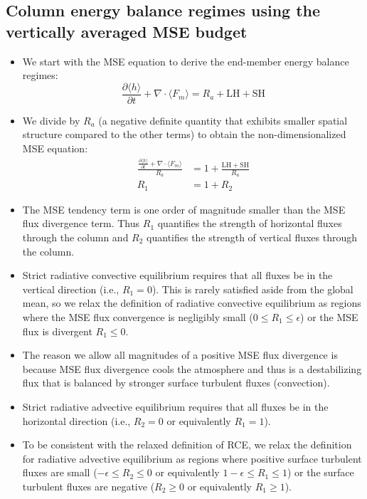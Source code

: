 \documentclass{ametsocV5}
\begin{document}
\subsection{Column energy balance regimes using the vertically averaged MSE budget}
\begin{itemize}
  \item We start with the MSE equation to derive the end-member energy balance regimes:
        \begin{equation} \label{eq:mse}
          \frac{\partial \langle h \rangle}{\partial t} + \nabla\cdot \langle F_{m} \rangle = R_{a} + \mathrm{LH+SH}
        \end{equation}
  \item We divide by \(R_{a}\) (a negative definite quantity that exhibits smaller spatial structure compared to the other terms) to obtain the non-dimensionalized MSE equation:
        \begin{align}
          \frac{\frac{\partial \langle h \rangle}{\partial t} + \nabla\cdot \langle F_{m} \rangle }{R_{a}} &= 1 + \frac{\mathrm{LH+SH}}{R_{a}} \\
          R_{1} &= 1 + R_{2}
        \end{align}
  \item The MSE tendency term is one order of magnitude smaller than the MSE flux divergence term. Thus \(R_{1}\) quantifies the strength of horizontal fluxes through the column and \(R_{2}\) quantifies the strength of vertical fluxes through the column.
  \item Strict radiative convective equilibrium requires that all fluxes be in the vertical direction (i.e., \(R_{1}=0\)). This is rarely satisfied aside from the global mean, so we relax the definition of radiative convective equilibrium as regions where the MSE flux convergence is negligibly small (\(0 \le R_{1} \le \epsilon\)) or the MSE flux is divergent \(R_{1}\le 0\).
  \item The reason we allow all magnitudes of a positive MSE flux divergence is because MSE flux divergence cools the atmosphere and thus is a destabilizing flux that is balanced by stronger surface turbulent fluxes (convection).
  \item Strict radiative advective equilibrium requires that all fluxes be in the horizontal direction (i.e., \(R_{2}=0\) or equivalently \(R_{1}=1\)).
  \item To be consistent with the relaxed definition of RCE, we relax the definition for radiative advective equilibrium as regions where positive surface turbulent fluxes are small (\(-\epsilon \le R_{2} \le 0 \) or equivalently \(1-\epsilon \le R_{1} \le 1\)) or the surface turbulent fluxes are negative (\(R_{2} \ge 0 \) or equivalently \(R_{1} \ge 1\)).

\end{itemize}
\end{document}
